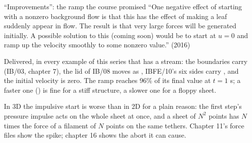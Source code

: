 \documentclass[aspectratio=169,11pt]{beamer}
\begin{document}
\begin{frame}{``Improvements'': the ramp the course promised}
\label{fr:ramp}
\small ``One negative effect of starting with a nonzero background flow is that this has the effect of making a leaf suddenly appear in flow. The result is that very large forces will be generated initially. A possible solution to this (coming soon) would be to start at $u = 0$ and ramp up the velocity smoothly to some nonzero value.'' (2016)
\vspace{2mm}

\footnotesize Delivered, in every example of this series that has a stream: the boundaries carry  (IB/03, chapter 7), the lid of IB/08 moves as , IBFE/10's six sides carry , and the initial velocity is zero. The ramp reaches 96\% of its final value at $t = 1$ s; a faster one () is fine for a stiff structure, a slower one for a floppy sheet.
\vspace{1mm}

\footnotesize In 3D the impulsive start is worse than in 2D for a plain reason: the first step's pressure impulse acts on the whole sheet at once, and a sheet of $N^2$ points has $N$ times the force of a filament of $N$ points on the same tethers. Chapter 11's force files show the spike; chapter 16 shows the abort it can cause.
\end{frame}
\end{document}
